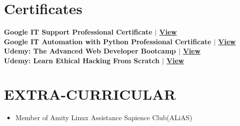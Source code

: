 \documentclass[letterpaper,11pt]{article}
\newcommand{\achievementItem}[1]{
  \item\small{
    {#1 \vspace{-6pt}}
  }
}
\begin{document}
 
\section{Certificates}
 \begin{itemize}[leftmargin=0.15in, label={}]
    \small{\item{
     \textbf{{Google IT Support Professional Certificate} $|$ \href{https://coursera.org/share/559ef9eba15de57964e3a61a85c78fc7}{View}} \\
     \textbf{{Google IT Automation with Python Professional Certificate} $|$ \href{http://coursera.org/verify/MR32ECWGGKRJ}{View}} \\
     \textbf{{Udemy: The Advanced Web Developer Bootcamp} $|$ \href{https://www.udemy.com/certificate/UC-3f33b66f-c557-41b0-8b72-43a44fb10625/}{View}} \\
     \textbf{{Udemy: Learn Ethical Hacking From Scratch} $|$ \href{https://www.udemy.com/certificate/UC-e07721a4-5688-4f33-8eb5-48b1aada718d/}{View}} \\
    }}
 \end{itemize}



\section{EXTRA-CURRICULAR}

\begin{itemize}[leftmargin=0.2in]

  \achievementItem{Member of Amity Linux Assistance Sapience Club(ALiAS)}

\end{itemize}
\end{document}
